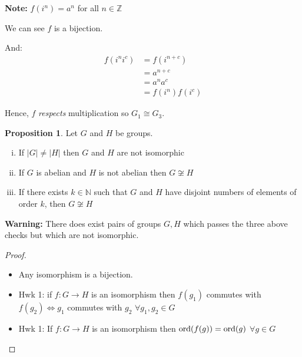 \documentclass{article}
\theoremstyle{definition} \newtheorem*{definition}{Definition}
\newtheorem{proposition}[theorem]{Proposition}
\newcommand{\ism}{\cong} \newcommand{\elemt}[2]{#1_{{#2}\sigma(#2)}}
\begin{document}
\textbf{Note:} $f(i^n) = a^n$ for all $n \in \mathbb{Z}$

We can see $f$ is a bijection.

And: \begin{align*} f(i^ni^c) &= f(i^{n+c})\\ &= a^{n+c} \\ &= a^n a^c \\ &=
  f(i^n)f(i^c) \end{align*}

Hence, $f$ \emph{respects} multiplication so $G_1 \ism G_3.$\\
\begin{proposition} Let $G$ and $H$ be groups.  \begin{enumerate}[(i)] \item If $|G|
        \neq |H|$ then $G$ and $H$ are not isomorphic \item If $G$ is abelian
          and $H$ is not abelian then $G \not\ism H$ \item If there exists $k
            \in \mathbb{N}$ such that $G$ and $H$ have disjoint numbers of
            elements of order $k$, then $G \not\ism H$ \end{enumerate}
      \end{proposition}

\textbf{Warning:} There does exist pairs of groups $G, H$ which passes the
three above checks but which are not isomorphic.

\begin{proof}\hfill \begin{itemize} \item Any isomorphism is a bijection.
        \item Hwk 1: if $f : G \rightarrow H$ is an isomorphism then $f(g_1)$
        commutes with $f(g_2) \iff g_1$ commutes with $g_2$ $\forall g_1,g_2
      \in G$ \item Hwk 1: If $f:G\rightarrow H$ is an isomorphism then
        $\operatorname{\text{ord}}(f(g))=\operatorname{\text{ord}}(g)$ $\forall g\in G$ \end{itemize} \end{proof}
\end{document}
